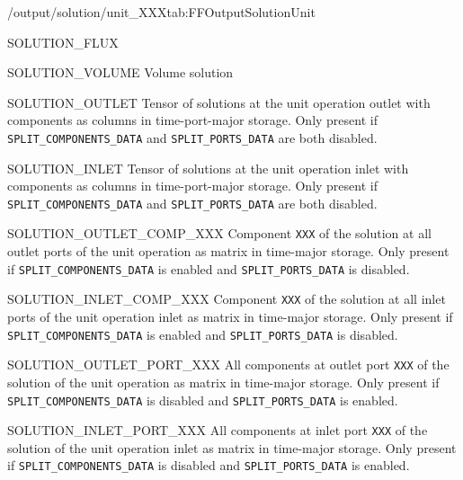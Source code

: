 \begin{groupscope}{/output/solution/unit\_XXX}{tab:FFOutputSolutionUnit}
\begin{dataset}[type=double,unit={\si{\mol\per\square\metre\per\second}}]{SOLUTION\_FLUX}
  \end{dataset}
  \begin{dataset}[type=double,unit={\si{\cubic\metre}}]{SOLUTION\_VOLUME}
    Volume solution
  \end{dataset}
  \begin{dataset}[type=double,unit={\si{\mol\per\cubic\metre\of{IV}}}]{SOLUTION\_OUTLET}
    Tensor of solutions at the unit operation outlet with components as columns in time-port-major storage.
    Only present if \texttt{SPLIT\_COMPONENTS\_DATA} and \texttt{SPLIT\_PORTS\_DATA} are both disabled.
  \end{dataset}
  \begin{dataset}[type=double,unit={\si{\mol\per\cubic\metre\of{IV}}}]{SOLUTION\_INLET}
    Tensor of solutions at the unit operation inlet with components as columns in time-port-major storage.
    Only present if \texttt{SPLIT\_COMPONENTS\_DATA} and \texttt{SPLIT\_PORTS\_DATA} are both disabled.
  \end{dataset}
  \begin{dataset}[type=double,unit={\si{\mol\per\cubic\metre\of{IV}}}]{SOLUTION\_OUTLET\_COMP\_XXX}
    Component \texttt{XXX} of the solution at all outlet ports of the unit operation as matrix in time-major storage.
    Only present if \texttt{SPLIT\_COMPONENTS\_DATA} is enabled and \texttt{SPLIT\_PORTS\_DATA} is disabled.
  \end{dataset}
  \begin{dataset}[type=double,unit={\si{\mol\per\cubic\metre\of{IV}}}]{SOLUTION\_INLET\_COMP\_XXX}
    Component \texttt{XXX} of the solution at all inlet ports of the unit operation inlet as matrix in time-major storage.
    Only present if \texttt{SPLIT\_COMPONENTS\_DATA} is enabled and \texttt{SPLIT\_PORTS\_DATA} is disabled.
  \end{dataset}
  \begin{dataset}[type=double,unit={\si{\mol\per\cubic\metre\of{IV}}}]{SOLUTION\_OUTLET\_PORT\_XXX}
    All components at outlet port \texttt{XXX} of the solution of the unit operation as matrix in time-major storage.
    Only present if \texttt{SPLIT\_COMPONENTS\_DATA} is disabled and \texttt{SPLIT\_PORTS\_DATA} is enabled.
  \end{dataset}
  \begin{dataset}[type=double,unit={\si{\mol\per\cubic\metre\of{IV}}}]{SOLUTION\_INLET\_PORT\_XXX}
    All components at inlet port \texttt{XXX} of the solution of the unit operation inlet as matrix in time-major storage.
    Only present if \texttt{SPLIT\_COMPONENTS\_DATA} is disabled and \texttt{SPLIT\_PORTS\_DATA} is enabled.

\end{dataset}
\end{groupscope}
